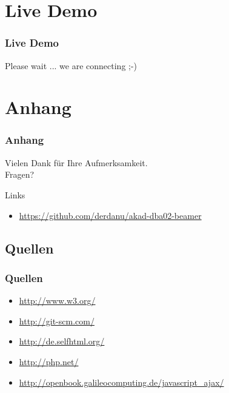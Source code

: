 \documentclass[xcolor=dvipsnames]{beamer}
\begin{document}
\section{Live Demo}
\begin{frame} %
  \frametitle{Live Demo} %
  \begin{center}  
      \Huge	Please wait ... we are connecting ;-)
  \end{center}
\end{frame}


\section{Anhang}
\begin{frame}
  \frametitle{Anhang} %
	\begin{block}{}	
		\begin{center}
			Vielen Dank für Ihre Aufmerksamkeit. \\
			Fragen?
		\end{center}	
	\end{block}
	\begin{block}{Links}	
		\begin{itemize}
			\item \url{https://github.com/derdanu/akad-dba02-beamer}						
		\end{itemize}
	\end{block}
\end{frame}

\subsection{Quellen}
\begin{frame} %
  \frametitle{Quellen} %
 	\begin{itemize}
		\item \url{http://www.w3.org/}
		\item \url{http://git-scm.com/}
		\item \url{http://de.selfhtml.org/}
		\item \url{http://php.net/}
		\item \url{http://openbook.galileocomputing.de/javascript_ajax/}
	\end{itemize}
\end{frame}
\end{document}
